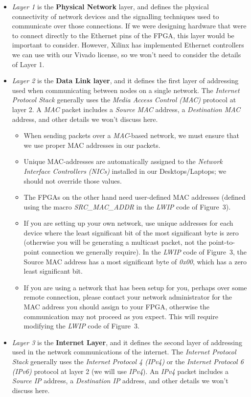 \documentclass[11pt]{article}
\begin{document}
\begin{itemize}
    \item \textit{Layer 1} is the \textbf{Physical Network} layer, and defines the physical connectivity of network devices and the signalling techniques used to communicate over those connections. If we were designing hardware that were to connect directly to the Ethernet pins of the FPGA, this layer would be important to consider. However, Xilinx has implemented Ethernet controllers we can use with our Vivado license, so we won't need to consider the details of Layer 1.
    \item \textit{Layer 2} is the \textbf{Data Link layer}, and it defines the first layer of addressing used when communicating between nodes on a single network. The \textit{Internet Protocol Stack } generally uses the \textit{Media Access Control (MAC)} protocol at layer 2. A \textit{MAC} packet includes a \textit{Source MAC} address, a \textit{Destination MAC} address, and other details we won't discuss here. 
    \begin{itemize}
        \item When sending packets over a \textit{MAC}-based network, we must ensure that we use proper MAC addresses in our packets.
        \item Unique MAC-addresses are automatically assigned to the \textit{Network Interface Controllers (NICs)} installed in our Desktops/Laptops; we should not override those values.
        \item The FPGAs on the other hand need user-defined MAC addresses (defined using the macro \textit{SRC\_MAC\_ADDR} in the \textit{LWIP} code of Figure~3).
        \item If you are setting up your own network, use unique addresses for each device where the least significant bit of the most significant byte is zero (otherwise you will be generating a multicast packet, not the point-to-point connection we generally require). In the \textit{LWIP} code of Figure~3, the Source MAC address has a most significant byte of \textit{0x00}, which has a zero least significant bit.
        \item If you are using a network that has been setup for you, perhaps over some remote connection, please contact your network administrator for the MAC address you should assign to your FPGA, otherwise the communication may not proceed as you expect. This will require modifying the \textit{LWIP} code of Figure~3.
    \end{itemize}
    \item \textit{Layer 3} is the \textbf{Internet Layer}, and it defines the second layer of addressing used in the network communications of the internet. The \textit{Internet Protocol Stack } generally uses the \textit{Internet Protocol 4 (IPv4)}  or the \textit{Internet Protocol 6 (IPv6) }protocol at layer 2 (we will use \textit{IPv4}). An \textit{IPv4} packet includes a \textit{Source IP} address, a \textit{Destination IP} address, and other details we won't discuss here.

\end{itemize}
\end{document}

